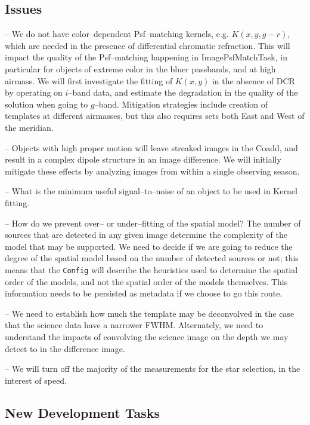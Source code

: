 \documentclass[12pt]{article}
\begin{document}
\subsection{Issues}

-- We do not have color--dependent Psf--matching kernels,
e.g. $K(x,y,g-r)$, which are needed in the presence of differential
chromatic refraction.  This will impact the quality of the
Psf--matching happening in ImagePsfMatchTask, in particular for
objects of extreme color in the bluer passbands, and at high airmass.
We will first investigate the fitting of $K(x,y)$ in the absence of
DCR by operating on $i$--band data, and estimate the degradation in
the quality of the solution when going to $g$--band.  Mitigation
strategies include creation of templates at different airmasses, but
this also requires sets both East and West of the meridian.

-- Objects with high proper motion will leave streaked images in the
Coadd, and result in a complex dipole structure in an image
difference.  We will initially mitigate these effects by analyzing
images from within a single observing season.

-- What is the minimum useful signal--to--noise of an object to be
used in Kernel fitting.

-- How do we prevent over-- or under--fitting of the spatial model?
The number of sources that are detected in any given image determine
the complexity of the model that may be supported.  We need to decide
if we are going to reduce the degree of the spatial model based on the
number of detected sources or not; this means that the {\tt Config}
will describe the heuristics used to determine the spatial order of
the models, and not the spatial order of the models themselves.  This
information needs to be persisted as metadata if we choose to go this
route.

-- We need to establish how much the template may be deconvolved in
the case that the science data have a narrower FWHM.  Alternately, we
need to understand the impacts of convolving the science image on the
depth we may detect to in the difference image.

-- We will turn off the majority of the measurements for the star
selection, in the interest of speed.


\subsection{New Development Tasks}
\end{document}
